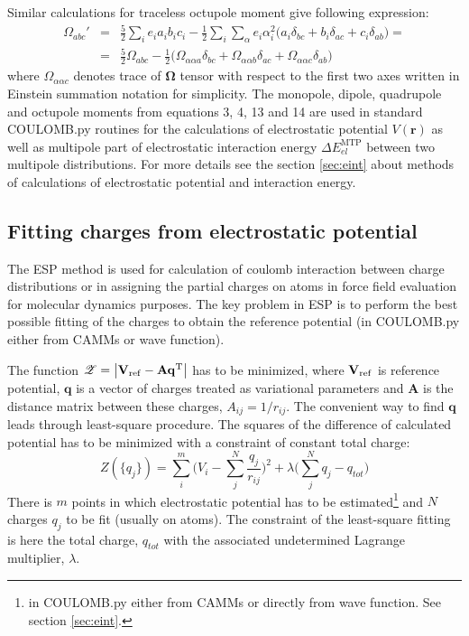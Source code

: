 \documentclass[a4paper,titlepage,twoside,fleqn]{article}
\begin{document}
Similar calculations for traceless octupole moment give
following expression:
\begin{eqnarray}
\Omega_{abc}' &=& \frac{5}{2}\sum_i e_ia_ib_ic_i - \frac{1}{2}\sum_i\sum_{\alpha}e_i\alpha_i^2 \big(
                                   a_i\delta_{bc} + b_i\delta_{ac} + c_i\delta_{ab}  \big) =\\ \nonumber
&=& \frac{5}{2}\Omega_{abc} - \frac{1}{2} \big( \Omega_{\alpha\alpha a}\delta_{bc} +
                                                \Omega_{\alpha\alpha b}\delta_{ac} + 
                                                \Omega_{\alpha\alpha c}\delta_{ab}  \big)
\end{eqnarray}
where $\Omega_{\alpha\alpha c}$ denotes trace of $\mathbf{\Omega}$ 
tensor with respect to the first two axes written in Einstein
summation notation for simplicity. The monopole, dipole, 
quadrupole and octupole moments from equations 3, 4, 13 and 14 
are used in standard {\sc COULOMB.py} routines for the calculations 
of electrostatic potential $V(\mathbf{r})$ as well as multipole part 
of electrostatic interaction energy $\Delta E^{\textrm{MTP}}_{el}$ 
between two multipole distributions. For more details see the section
\ref{sec:eint} about methods of calculations of electrostatic potential 
and interaction energy.

\subsection{Fitting charges from electrostatic potential}
The ESP method is used for calculation of coulomb interaction
between charge distributions or in assigning the partial charges 
on atoms in force field evaluation for molecular dynamics purposes. 
The key problem in ESP is to perform the best possible fitting of 
the charges to obtain the reference potential (in {\sc COULOMB.py} 
either from CAMMs or wave function). 

The function $\mathscr{Z}=\big| {\mathbf V}_{\rm ref} - {\mathbf A} {\mathbf q}^{\rm T}\big|$ 
has to be minimized, where ${\mathbf V}_{\rm ref}$ is reference 
potential, ${\mathbf q}$ is a vector of charges treated as variational 
parameters and ${\mathbf A}$ is the distance matrix between these charges, 
$A_{ij}=1/r_{ij}$. The convenient way to find ${\mathbf q}$ leads through 
least-square procedure. The squares of the difference of calculated 
potential has to be minimized with a constraint of constant total charge:
\begin{equation}\label{e:Zfunc}
Z(\{q_j\}) = \sum_i^m \Big(V_i-\sum_j^N \frac{q_j}{r_{ij}} \Big)^2 + \lambda\Big(\sum_j^N q_j-q_{tot}\Big)
\end{equation}
There is $m$ points in which electrostatic potential has to be
estimated\footnote{in {\sc COULOMB.py} either from CAMMs or 
directly from wave function. See section \ref{sec:eint}.} and $N$ 
charges $q_j$ to be fit (usually on atoms). The constraint
of the least-square fitting is here the total charge, $q_{tot}$
with the associated undetermined Lagrange multiplier, $\lambda$.
\end{document}
